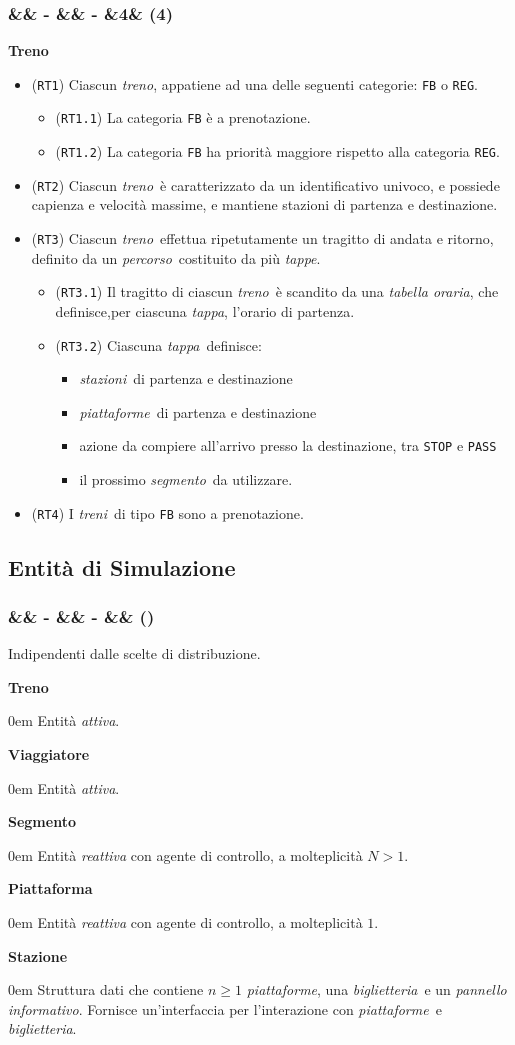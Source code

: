 \documentclass[slidestop,compress,blackandwhite]{beamer}
\newcommand{\ttt}[1]{\texttt{#1}}
\newcommand{\ii}[1]{\textit{#1}}
\newcommand{\treno}{\ii{treno}}
\newcommand{\treni}{\ii{treni}}
\newcommand{\stazioni}{\ii{stazioni}}
\newcommand{\piattaforme}{\ii{piattaforme}}
\newcommand{\segmento}{\ii{segmento}}
\newcommand{\route}{\ii{percorso}}
\newcommand{\stage}{\ii{tappa}}
\newcommand{\stages}{\ii{tappe}}
\newcommand{\biglietteria}{\ii{biglietteria}}
\newcommand{\timetable}{\ii{tabella oraria}}
\newcommand{\describe}[2]{
	\textbf{#1}\\
	\begin{addmargin}[2em]{0em}
		#2
	\end{addmargin}
}
\newcommand{\newtitle}[4]{
	#1 
	\ifx&#2&%
	\else
  		\large- #2
	\fi
	\ifx&#3&%
	\else
  		\normalsize- #3
	\fi
	\ifx&#4&%
	\else
  		\normalsize (#4)
	\fi
}
\newcommand{\newframe}[5]{
	\begin{frame}
		\frametitle{\newtitle{#1}{#2}{#3}{#4}}
		#5
	\end{frame}
}
\newcommand{\itemt}[1]{\item (\ttt{#1})}
\begin{document}
	\newframe{}{}{}{4}{
		\textbf{Treno}
		\begin{itemize}
			\itemt{RT1} Ciascun \treno, appatiene ad una delle seguenti categorie: \ttt{FB} o \ttt{REG}.
				\begin{itemize}
					\itemt{RT1.1} La categoria \ttt{FB} è a prenotazione. 
					\itemt{RT1.2} La categoria \ttt{FB} ha priorità maggiore rispetto alla categoria \ttt{REG}. 
				\end{itemize}
			\itemt{RT2} Ciascun \treno~è caratterizzato da un identificativo univoco, e possiede capienza e velocità massime, e mantiene stazioni di partenza e destinazione.
			\itemt{RT3} Ciascun \treno~effettua ripetutamente un tragitto di andata e ritorno, definito da un \route~costituito da più \stages.
				\begin{itemize}
					\itemt{RT3.1} Il tragitto di ciascun \treno~è scandito da una \timetable, che definisce,per ciascuna \stage, l'orario di partenza.
				\itemt{RT3.2} Ciascuna \stage~definisce:
				\begin{itemize}
					\item \stazioni~di partenza e destinazione
					\item \piattaforme~di partenza e destinazione
					\item azione da compiere all'arrivo presso la destinazione, tra \ttt{STOP} e \ttt{PASS}
					\item il prossimo \segmento~da utilizzare.
				\end{itemize}
			\end{itemize}
			\itemt{RT4} I \treni~di tipo \ttt{FB} sono a prenotazione.
		\end{itemize}
	}


	
	\subsection{Entità di Simulazione}\label{entities}

	\newframe{}{}{}{}{
		Indipendenti dalle scelte di distribuzione.
		
		\vspace{0.2cm}
		\describe{Treno}{Entità \ii{attiva}.}
	
		\describe{Viaggiatore}{Entità \ii{attiva}.}
		
		\describe{Segmento}{Entità \ii{reattiva} con agente di controllo, a molteplicità $N>1$.}
		
		\describe{Piattaforma}{Entità \ii{reattiva} con agente di controllo, a molteplicità $1$.}
		
		\describe{Stazione}{Struttura dati che contiene $n\ge1$ \piattaforme, una \biglietteria~e un \ii{pannello informativo}. Fornisce un'interfaccia per l'interazione con \piattaforme~e \biglietteria.}
	}
\end{document}
